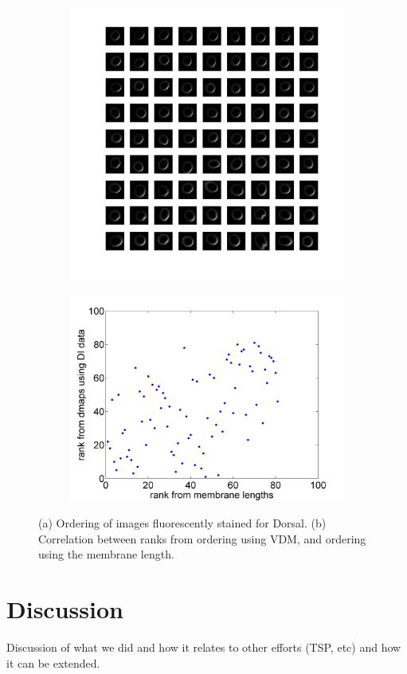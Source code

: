 \documentclass[11pt]{article}
\begin{document}
\begin{figure}[h]
\begin{subfigure}[c]{0.45\textwidth}
\includegraphics[width=\textwidth]{DI_array}
\caption{}
\end{subfigure}
\begin{subfigure}[c]{0.5\textwidth}
\includegraphics[width=\textwidth]{DI_rank_corr}
\caption{}
\end{subfigure}
\caption{(a) Ordering of images fluorescently stained for Dorsal. (b) Correlation between ranks from ordering using VDM, and ordering using the membrane length.}
\label{fig:Dl}
\end{figure}

\section{Discussion}
Discussion of what we did and how it relates to other efforts (TSP, etc) and how it can be extended.




\end{document}
